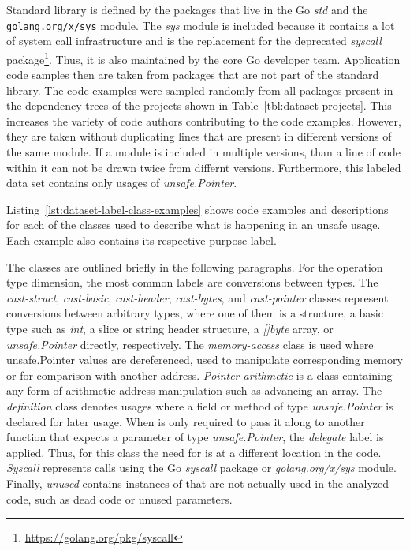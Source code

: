 Standard library is defined by the packages that live in the Go \textit{std} and the \texttt{golang.org/x/sys} module.
The \textit{sys} module is included because it contains a lot of system call infrastructure and is the replacement for
the deprecated \textit{syscall} package\footnote{\url{https://golang.org/pkg/syscall}}.
Thus, it is also maintained by the core Go developer team.
Application code samples then are taken from packages that are not part of the standard library.
The \numberLabeledCodeSnippets{} code examples were sampled randomly from all packages present in the dependency trees
of the projects shown in Table~\ref{tbl:dataset-projects}.
This increases the variety of code authors contributing to the code examples.
However, they are taken without duplicating lines that are present in different versions of the same module.
If a module is included in multiple versions, than a line of code within it can not be drawn twice from differnt
versions.
Furthermore, this labeled data set contains only usages of \textit{unsafe.Pointer}.

Listing~\ref{lst:dataset-label-class-examples} shows code examples and descriptions for each of the classes used to
describe what is happening in an unsafe usage.
Each example also contains its respective purpose label.



The classes are outlined briefly in the following paragraphs.
For the \unsafe{} operation type dimension, the most common labels are conversions between types.
The \textit{cast-struct}, \textit{cast-basic}, \textit{cast-header}, \textit{cast-bytes}, and \textit{cast-pointer}
classes represent conversions between arbitrary types, where one of them is a structure, a basic type such as
\textit{int}, a slice or string header structure, a \textit{[]byte} array, or \textit{unsafe.Pointer} directly,
respectively.
The \textit{memory-access} class is used where unsafe.Pointer values are dereferenced, used to manipulate corresponding
memory or for comparison with another address.
\textit{Pointer-arithmetic} is a class containing any form of arithmetic address manipulation such as advancing an
array.
The \textit{definition} class denotes usages where a field or method of type \textit{unsafe.Pointer} is declared for
later usage.
When \unsafe{} is only required to pass it along to another function that expects a parameter of type
\textit{unsafe.Pointer}, the \textit{delegate} label is applied.
Thus, for this class the need for \unsafe{} is at a different location in the code.
\textit{Syscall} represents calls using the Go \textit{syscall} package or \textit{golang.org/x/sys} module.
Finally, \textit{unused} contains instances of \unsafe{} that are not actually used in the analyzed code, such as dead
code or unused parameters.

